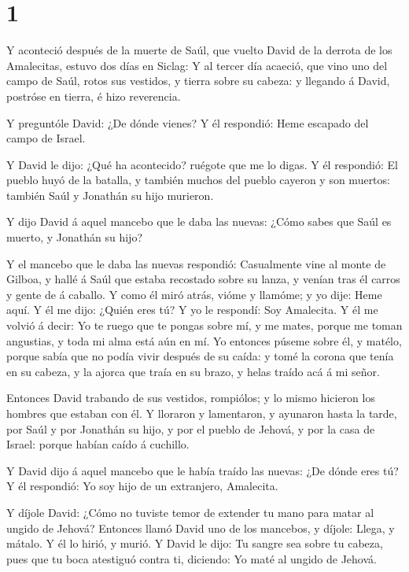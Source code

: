 \hypertarget{section}{%
\section{1}\label{section}}

 Y aconteció después de la muerte de Saúl, que vuelto David
de la derrota de los Amalecitas, estuvo dos días en Siclag: 
Y al tercer día acaeció, que vino uno del campo de Saúl, rotos sus
vestidos, y tierra sobre su cabeza: y llegando á David, postróse en
tierra, é hizo reverencia.

 Y preguntóle David: ¿De dónde vienes? Y él respondió: Heme
escapado del campo de Israel.

 Y David le dijo: ¿Qué ha acontecido? ruégote que me lo
digas. Y él respondió: El pueblo huyó de la batalla, y también muchos
del pueblo cayeron y son muertos: también Saúl y Jonathán su hijo
murieron.

 Y dijo David á aquel mancebo que le daba las nuevas: ¿Cómo
sabes que Saúl es muerto, y Jonathán su hijo?

 Y el mancebo que le daba las nuevas respondió: Casualmente
vine al monte de Gilboa, y hallé á Saúl que estaba recostado sobre su
lanza, y venían tras él carros y gente de á caballo.  Y como
él miró atrás, vióme y llamóme; y yo dije: Heme aquí.  Y él
me dijo: ¿Quién eres tú? Y yo le respondí: Soy Amalecita.  Y
él me volvió á decir: Yo te ruego que te pongas sobre mí, y me mates,
porque me toman angustias, y toda mi alma está aún en mí. 
Yo entonces púseme sobre él, y matélo, porque sabía que no podía vivir
después de su caída: y tomé la corona que tenía en su cabeza, y la
ajorca que traía en su brazo, y helas traído acá á mi señor.

 Entonces David trabando de sus vestidos, rompiólos; y lo
mismo hicieron los hombres que estaban con él.  Y lloraron
y lamentaron, y ayunaron hasta la tarde, por Saúl y por Jonathán su
hijo, y por el pueblo de Jehová, y por la casa de Israel: porque habían
caído á cuchillo.

 Y David dijo á aquel mancebo que le había traído las
nuevas: ¿De dónde eres tú? Y él respondió: Yo soy hijo de un extranjero,
Amalecita.

 Y díjole David: ¿Cómo no tuviste temor de extender tu mano
para matar al ungido de Jehová?  Entonces llamó David uno
de los mancebos, y díjole: Llega, y mátalo. Y él lo hirió, y murió.
 Y David le dijo: Tu sangre sea sobre tu cabeza, pues que
tu boca atestiguó contra ti, diciendo: Yo maté al ungido de Jehová.

